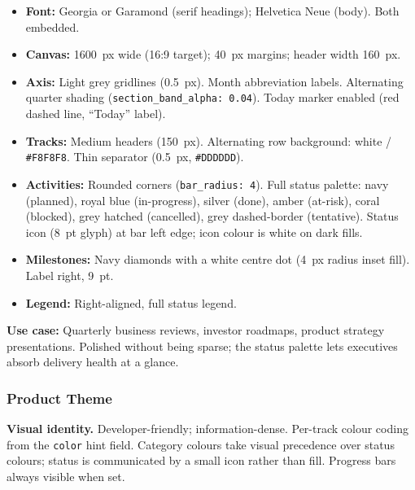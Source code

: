 \begin{itemize}
  \item \textbf{Font:} Georgia or Garamond (serif headings); Helvetica Neue (body). Both
        embedded.
  \item \textbf{Canvas:} 1600~px wide (16:9 target); 40~px margins; header width 160~px.
  \item \textbf{Axis:} Light grey gridlines (0.5~px). Month abbreviation labels. Alternating
        quarter shading (\texttt{section\_band\_alpha: 0.04}). Today marker enabled
        (red dashed line, ``Today'' label).
  \item \textbf{Tracks:} Medium headers (150~px). Alternating row background: white /
        \texttt{\#F8F8F8}. Thin separator (0.5~px, \texttt{\#DDDDDD}).
  \item \textbf{Activities:} Rounded corners (\texttt{bar\_radius: 4}). Full status palette:
        navy (planned), royal blue (in-progress), silver (done), amber (at-risk), coral
        (blocked), grey hatched (cancelled), grey dashed-border (tentative). Status icon
        (8~pt glyph) at bar left edge; icon colour is white on dark fills.
  \item \textbf{Milestones:} Navy diamonds with a white centre dot (4~px radius inset fill).
        Label right, 9~pt.
  \item \textbf{Legend:} Right-aligned, full status legend.
\end{itemize}

\textbf{Use case:} Quarterly business reviews, investor roadmaps, product strategy
presentations. Polished without being sparse; the status palette lets executives absorb
delivery health at a glance.

\subsubsection{Product Theme}
\label{sec:theme-product}

\textbf{Visual identity.}
Developer-friendly; information-dense. Per-track colour coding from the \texttt{color} hint
field. Category colours take visual precedence over status colours; status is communicated
by a small icon rather than fill. Progress bars always visible when set.

